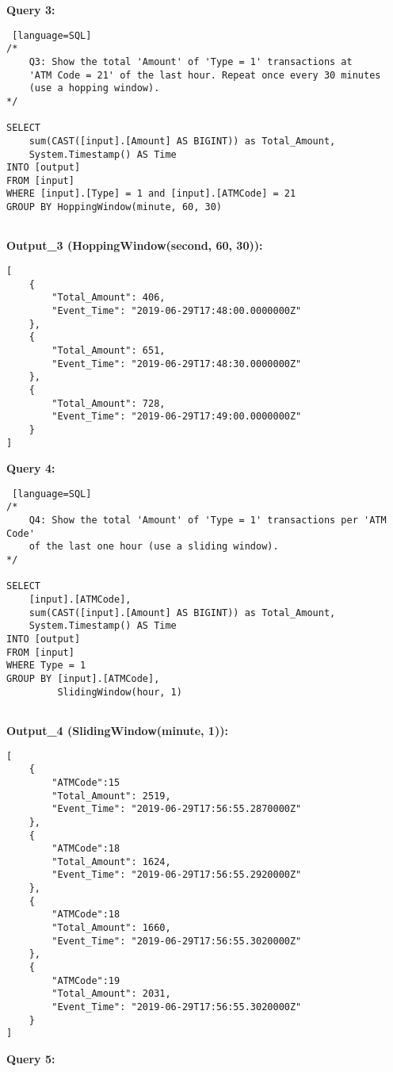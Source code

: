 \documentclass[12pt]{report}
\begin{document}
{\newpage
\noindent \textbf{Query 3:}

\begin{lstlisting} [language=SQL]
/*
    Q3: Show the total 'Amount' of 'Type = 1' transactions at 
    'ATM Code = 21' of the last hour. Repeat once every 30 minutes 
    (use a hopping window).
*/

SELECT
    sum(CAST([input].[Amount] AS BIGINT)) as Total_Amount, 
    System.Timestamp() AS Time
INTO [output]
FROM [input]
WHERE [input].[Type] = 1 and [input].[ATMCode] = 21
GROUP BY HoppingWindow(minute, 60, 30)


\end{lstlisting}
\bigbreak


\noindent \textbf{Output\_3 (HoppingWindow(second, 60, 30)): }
\begin{lstlisting}
[
	{
		"Total_Amount": 406,
		"Event_Time": "2019-06-29T17:48:00.0000000Z"
	},
	{
		"Total_Amount": 651,
		"Event_Time": "2019-06-29T17:48:30.0000000Z"
	},
	{
		"Total_Amount": 728,
		"Event_Time": "2019-06-29T17:49:00.0000000Z"
	}
]
\end{lstlisting}

\newpage
\noindent \textbf{Query 4:}

\begin{lstlisting} [language=SQL]
/*
    Q4: Show the total 'Amount' of 'Type = 1' transactions per 'ATM Code'
    of the last one hour (use a sliding window).
*/

SELECT
    [input].[ATMCode],
    sum(CAST([input].[Amount] AS BIGINT)) as Total_Amount, 
    System.Timestamp() AS Time
INTO [output]
FROM [input]
WHERE Type = 1
GROUP BY [input].[ATMCode],
         SlidingWindow(hour, 1)


\end{lstlisting}

\bigbreak


\noindent \textbf{Output\_4 (SlidingWindow(minute, 1)): }
\begin{lstlisting}
[
	{
		"ATMCode":15
		"Total_Amount": 2519,
		"Event_Time": "2019-06-29T17:56:55.2870000Z"
	},
	{
		"ATMCode":18
		"Total_Amount": 1624,
		"Event_Time": "2019-06-29T17:56:55.2920000Z"
	},
	{
		"ATMCode":18
		"Total_Amount": 1660,
		"Event_Time": "2019-06-29T17:56:55.3020000Z"
	},
	{
		"ATMCode":19
		"Total_Amount": 2031,
		"Event_Time": "2019-06-29T17:56:55.3020000Z"
	}
]
\end{lstlisting}


\newpage

\noindent \textbf{Query 5:}

}
\end{document}
